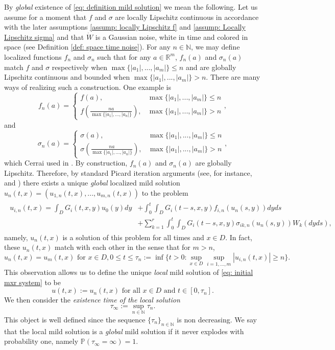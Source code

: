 \documentclass[12pt]{article}
\theoremstyle{definition}
\theoremstyle{remark}
\begin{document}
By \textit{global} existence of \eqref{eq: definition mild solution} we mean the following. Let us assume for a moment that $f$ and $\sigma$ are locally Lipschitz continuous in accordance with the later assumptions \ref{assump: locally Lipschitz f} and \ref{assump: Locally Lipschitz sigma} and that $\dot{W}$ is a Gaussian noise, white in time and colored in space (see Definition \ref{def: space time noise}). For any $n\in \mathbb N$, we may define localized functions $f_n$ and $\sigma_n$ such that for any $a\in \mathbb R^m$, $f_n(a)$ and $\sigma_n(a)$ match $f$ and $\sigma$ respectively when $\max\limits \{|a_1|,...,|a_m|\}\leq n$ and are globally Lipschitz continuous and bounded when $\max \{|a_1|,...,|a_m|\}>n$. There are many ways of realizing such a construction. One example is
\[
f_n(a) = \begin{cases}
    f(a),&\max\{|a_1|,...,|a_m|\}\leq n\\
    f\left(\frac{na}{\max\{|a_1|,...,|a_n|\}}\right), &\max\{|a_1|,...,|a_m|\}> n
\end{cases},
\]
and
\[
\sigma_n(a) = \begin{cases}
    \sigma(a),&\max\{|a_1|,...,|a_m|\}\leq n\\
    \sigma\left(\frac{na}{\max\{|a_1|,...,|a_n|\}}\right), &\max\{|a_1|,...,|a_m|\}> n
\end{cases},
\]
which Cerrai used in \cite{cerrai2003stochastic}. By construction, $f_n(a)$ and $\sigma_n(a)$ are globally Lipschitz. Therefore, by standard Picard iteration arguments (see, for instance, \cite{da2014stochastic} and \cite{dalang2026stochastic}) there exists a unique \textit{global} localized mild solution $u_n(t,x) = (u_{1,n}(t,x),...,u_{m,n}(t,x))$ to the problem
\begin{align}\label{eq: truncated global solution mxr}
\begin{split}
    u_{i,n}(t,x) = \int_D G_i(t,x,y)u_0(y)dy &+ \int_0^t\int_D G_i(t-s,x,y)f_{i,n}(u_n(s,y))dyds\\
    &+\sum_{k=1}^r\int_0^t\int_D G_i(t-s,x,y)\sigma_{ik,n}(u_n(s,y))W_k(dyds),
\end{split}
\end{align}
namely, $u_n(t,x)$ is a solution of this problem for all times and $x\in D$. In fact, these $u_n(t,x)$ match with each other in the sense that for $m>n$,
\[
u_n(t,x) = u_m(t,x) \text{ for } x\in D,  0\leq t\leq \tau_n := \inf\Big \{t>0: \sup\limits_{x\in D}\sup\limits_{i=1,...,m} |u_{i,n}(t,x)| \geq n\Big\}.
\]
This observation allows us to define the unique \textit{local} mild solution of \eqref{eq: initial mxr system} to be 
\[
u(t,x) := u_n(t,x) \text{ for all } x\in D \text{ and } t\in [0,\tau_n].
\]
We then consider the \textit{existence time of the local solution}
\[
\tau_{\infty}:= \sup_{n\in \mathbb N} \tau_n.
\]
This object is well defined since the sequence $\{\tau_n\}_{n\in \mathbb N}$ is non decreasing. We say that the local mild solution is a \textit{global} mild solution if it never explodes with probability one,  namely $\mathbb P(\tau_{\infty} = \infty) = 1$.
\end{document}

